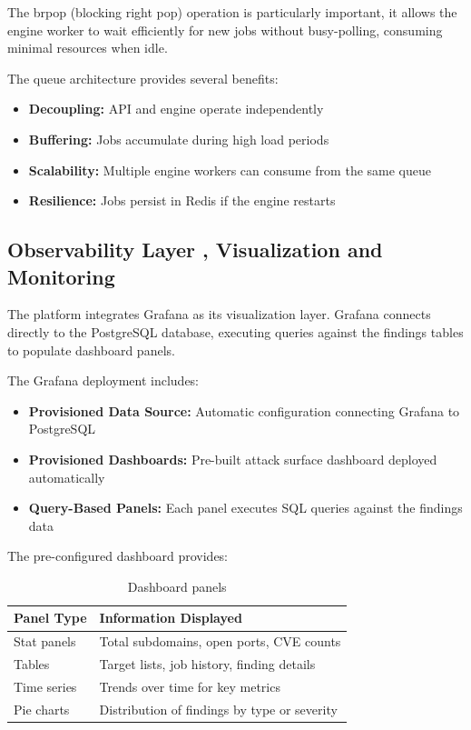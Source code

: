 \documentclass[a4paper,12pt]{report}
\begin{document}
The brpop (blocking right pop) operation is particularly important, it allows the engine worker to wait efficiently for new jobs without busy-polling, consuming minimal resources when idle.\hfill \break

The queue architecture provides several benefits:
\begin{itemize}
\item \textbf{Decoupling:} API and engine operate independently
\item \textbf{Buffering:} Jobs accumulate during high load periods
\item \textbf{Scalability:} Multiple engine workers can consume from the same queue
\item \textbf{Resilience:} Jobs persist in Redis if the engine restarts
\end{itemize}

\subsection{Observability Layer ,  Visualization and Monitoring}

The platform integrates Grafana \cite{grafana_docs} as its visualization layer. Grafana connects directly to the PostgreSQL \cite{postgresql_docs} database, executing queries against the findings tables to populate dashboard panels.\hfill 

The Grafana deployment includes:
\begin{itemize}
\item \textbf{Provisioned Data Source:} Automatic configuration connecting Grafana to PostgreSQL
\item \textbf{Provisioned Dashboards:} Pre-built attack surface dashboard deployed automatically
\item \textbf{Query-Based Panels:} Each panel executes SQL queries against the findings data
\end{itemize}

The pre-configured dashboard provides:\hfill \break

\begin{table}[H]
\centering
\caption{Dashboard panels}
\begin{tabular}{|l|l|}
\hline
\textbf{Panel Type} & \textbf{Information Displayed} \\
\hline
Stat panels & Total subdomains, open ports, CVE counts \\
\hline
Tables & Target lists, job history, finding details \\
\hline
Time series & Trends over time for key metrics \\
\hline
Pie charts & Distribution of findings by type or severity \\
\hline
\end{tabular}
\label{tab:dashboard_panels}
\end{table}
\end{document}
